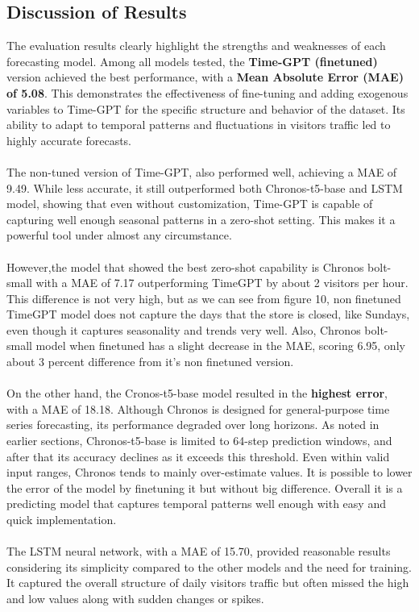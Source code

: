 \documentclass{article}
\begin{document}
\subsection{Discussion of Results}
 The evaluation results clearly highlight the strengths and weaknesses of each forecasting model. Among all models tested, the \textbf{Time-GPT (finetuned)} version achieved the best performance, with a \textbf{Mean Absolute Error (MAE) of 5.08}. This demonstrates the effectiveness of fine-tuning and adding exogenous variables to Time-GPT for the specific structure and behavior of the dataset. Its ability to adapt to temporal patterns and fluctuations in visitors traffic led to highly accurate forecasts.\\
 \\
 The non-tuned version of Time-GPT, also performed well, achieving a MAE of 9.49. While less accurate, it still outperformed both Chronos-t5-base and LSTM model, showing that even without customization, Time-GPT is capable of capturing well enough seasonal patterns in a zero-shot setting. This makes it a powerful tool under almost any circumstance.\\
 \\
 However,the model that showed the best zero-shot capability is Chronos bolt-small with a MAE of 7.17 outperforming TimeGPT by about 2 visitors per hour. This difference is not very high, but as we can see from figure 10, non finetuned TimeGPT model does not capture the days that the store is closed, like Sundays, even though it captures seasonality and trends very well. Also, Chronos bolt-small model when finetuned has a slight decrease in the MAE, scoring 6.95, only about 3 percent difference from it's non finetuned version.\\
 \\
 On the other hand, the Cronos-t5-base model resulted in the \textbf{highest error}, with a MAE of 18.18. Although Chronos is designed for general-purpose time series forecasting, its performance degraded over long horizons. As noted in earlier sections, Chronos-t5-base is limited to 64-step prediction windows, and after that its accuracy declines as it exceeds this threshold. Even within valid input ranges, Chronos tends to mainly over-estimate values. It is possible to lower the error of the model by finetuning it but without big difference. Overall it is a predicting model that captures temporal patterns well enough with easy and quick implementation.\\
 \\
The LSTM neural network, with a MAE of 15.70, provided reasonable results considering its simplicity compared to the other models and the need for training. It captured the overall structure of daily visitors traffic but often missed the high and low values along with sudden changes or spikes.\\
\end{document}
